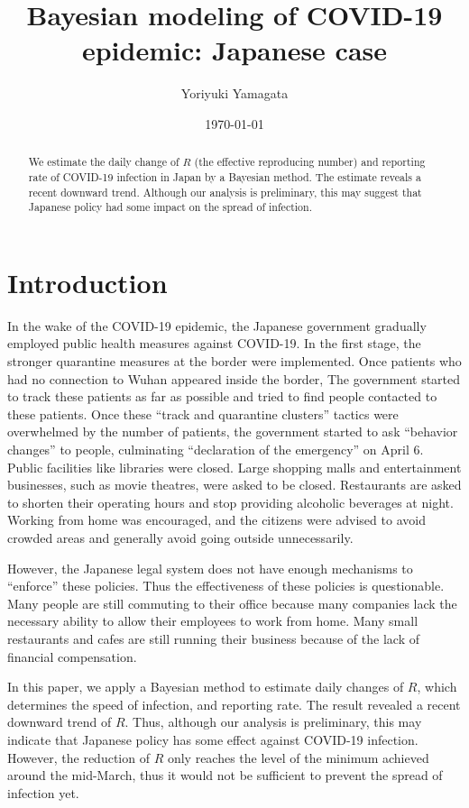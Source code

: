 \documentclass{amsart}
\title{Bayesian modeling of COVID-19 epidemic: Japanese case}
\author{Yoriyuki Yamagata}
\date{\today}
\begin{document}
\maketitle

\begin{abstract}
 We estimate the daily change of $R$ (the effective reproducing number) and reporting rate of COVID-19 infection in Japan by a Bayesian method.
 The estimate reveals a recent downward trend.
 Although our analysis is preliminary, this may suggest that Japanese policy had some impact on the spread of infection.
\end{abstract}

\section{Introduction}

In the wake of the COVID-19 epidemic, the Japanese government gradually employed public health measures against COVID-19.
In the first stage, the stronger quarantine measures at the border were implemented.
Once patients who had no connection to Wuhan appeared inside the border, The government started to track these patients as far as possible and tried to find people contacted to these patients.
Once these ``track and quarantine clusters'' tactics were overwhelmed by the number of patients, the government started to ask ``behavior changes'' to people, culminating ``declaration of the emergency'' on April 6.
Public facilities like libraries were closed.
Large shopping malls and entertainment businesses, such as movie theatres, were asked to be closed.
Restaurants are asked to shorten their operating hours and stop providing alcoholic beverages at night.
Working from home was encouraged, and the citizens were advised to avoid crowded areas and generally avoid going outside unnecessarily.

However, the Japanese legal system does not have enough mechanisms to ``enforce'' these policies.
Thus the effectiveness of these policies is questionable.
Many people are still commuting to their office because many companies lack the necessary ability to allow their employees to work from home.
Many small restaurants and cafes are still running their business because of the lack of financial compensation.

In this paper, we apply a Bayesian method to estimate daily changes of $R$, which determines the speed of infection, and reporting rate.
The result revealed a recent downward trend of $R$.
Thus, although our analysis is preliminary, this may indicate that Japanese policy has some effect against COVID-19 infection.
However, the reduction of $R$ only reaches the level of the minimum achieved around the mid-March, thus it would not be sufficient to prevent the spread of infection yet.
\end{document}
